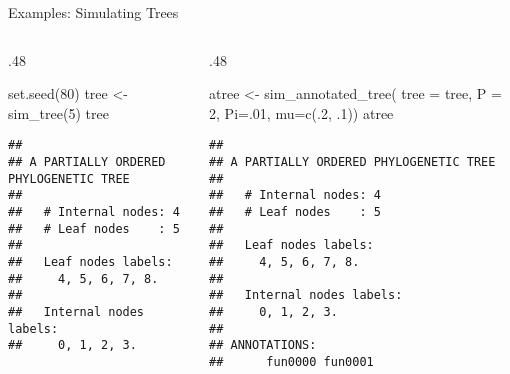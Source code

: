\documentclass[9pt,ignorenonframetext,]{beamer}
\newenvironment{Shaded}{\begin{snugshade}}{\end{snugshade}}
\newcommand{\KeywordTok}[1]{\textcolor[rgb]{0.94,0.87,0.69}{#1}}
\newcommand{\DataTypeTok}[1]{\textcolor[rgb]{0.87,0.87,0.75}{#1}}
\newcommand{\DecValTok}[1]{\textcolor[rgb]{0.86,0.86,0.80}{#1}}
\newcommand{\StringTok}[1]{\textcolor[rgb]{0.80,0.58,0.58}{#1}}
\newcommand{\NormalTok}[1]{\textcolor[rgb]{0.80,0.80,0.80}{#1}}
\def\begincols{\begin{columns}[T]}
\def\begincol{\begin{column}[T]}
\def\endcol{\end{column}}
\def\endcols{\end{columns}}
\begin{document}
\begin{frame}[fragile,t]{Examples: Simulating Trees}

\begincols

\begincol{.48\textwidth}

\footnotesize

\begin{Shaded}
\begin{Highlighting}[]
\KeywordTok{set.seed}\NormalTok{(}\DecValTok{80}\NormalTok{)}
\NormalTok{tree <-}\StringTok{ }\KeywordTok{sim_tree}\NormalTok{(}\DecValTok{5}\NormalTok{)}
\NormalTok{tree}
\end{Highlighting}
\end{Shaded}

\begin{verbatim}
## 
## A PARTIALLY ORDERED PHYLOGENETIC TREE
## 
##   # Internal nodes: 4
##   # Leaf nodes    : 5
## 
##   Leaf nodes labels: 
##     4, 5, 6, 7, 8.
## 
##   Internal nodes labels:
##     0, 1, 2, 3.
\end{verbatim}

\normalsize

\endcol

\begincol{.48\textwidth}

\footnotesize

\begin{Shaded}
\begin{Highlighting}[]
\NormalTok{atree <-}\StringTok{ }\KeywordTok{sim_annotated_tree}\NormalTok{(}
  \DataTypeTok{tree =}\NormalTok{ tree, }\DataTypeTok{P =} \DecValTok{2}\NormalTok{, }\DataTypeTok{Pi=}\NormalTok{.}\DecValTok{01}\NormalTok{, }\DataTypeTok{mu=}\KeywordTok{c}\NormalTok{(.}\DecValTok{2}\NormalTok{, .}\DecValTok{1}\NormalTok{))}
\NormalTok{atree}
\end{Highlighting}
\end{Shaded}

\begin{verbatim}
## 
## A PARTIALLY ORDERED PHYLOGENETIC TREE
## 
##   # Internal nodes: 4
##   # Leaf nodes    : 5
## 
##   Leaf nodes labels: 
##     4, 5, 6, 7, 8.
## 
##   Internal nodes labels:
##     0, 1, 2, 3.
## 
## ANNOTATIONS:
##      fun0000 fun0001
\end{verbatim}

\normalsize

\endcol

\endcols

\end{frame}
\end{document}
